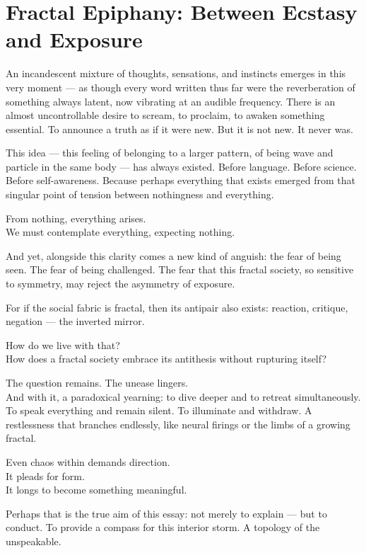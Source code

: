 \section{Fractal Epiphany: Between Ecstasy and Exposure}

An incandescent mixture of thoughts, sensations, and instincts emerges in this very moment — as though every word written thus far were the reverberation of something always latent, now vibrating at an audible frequency. There is an almost uncontrollable desire to scream, to proclaim, to awaken something essential. To announce a truth as if it were new. But it is not new. It never was.

This idea — this feeling of belonging to a larger pattern, of being wave and particle in the same body — has always existed. Before language. Before science. Before self-awareness. Because perhaps everything that exists emerged from that singular point of tension between nothingness and everything.

From nothing, everything arises.\\
We must contemplate everything, expecting nothing.

And yet, alongside this clarity comes a new kind of anguish: the fear of being seen. The fear of being challenged. The fear that this fractal society, so sensitive to symmetry, may reject the asymmetry of exposure.

For if the social fabric is fractal, then its antipair also exists: reaction, critique, negation — the inverted mirror.

How do we live with that?\\
How does a fractal society embrace its antithesis without rupturing itself?

The question remains. The unease lingers.\\
And with it, a paradoxical yearning: to dive deeper and to retreat simultaneously. To speak everything and remain silent. To illuminate and withdraw. A restlessness that branches endlessly, like neural firings or the limbs of a growing fractal.

Even chaos within demands direction.\\
It pleads for form.\\
It longs to become something meaningful.

Perhaps that is the true aim of this essay: not merely to explain — but to conduct. To provide a compass for this interior storm. A topology of the unspeakable.